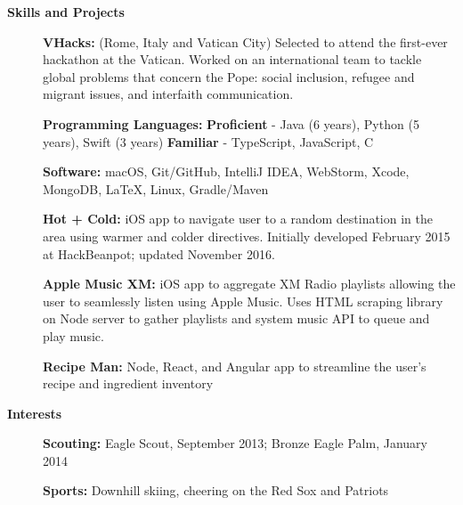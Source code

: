 \documentclass[letterpaper,10pt]{article}
\newcommand{\resheading}[1]{{\large \colorbox{mygrey}{\begin{minipage}{\textwidth}{\textbf{#1 \vphantom{p\^{E}}}}\end{minipage}}}}
\begin{document}
\resheading{Skills and Projects}
{\small
	\begin{description}
    \item[] \hspace{0.03in} \textbf{VHacks:} {\footnotesize (Rome, Italy and Vatican City) Selected to attend the first-ever hackathon at the Vatican. Worked on an international team to tackle global problems that concern the Pope: social inclusion, refugee and migrant issues, and interfaith communication.}
		\item[] \hspace{0.03in} \textbf{Programming Languages:} {\footnotesize \textbf{Proficient} - Java (6 years), Python (5 years), Swift (3 years) \enspace \textbf{Familiar} - TypeScript, JavaScript, C}
		\item[] \hspace{0.03in} \textbf{Software:} {\footnotesize macOS, Git/GitHub, IntelliJ IDEA, WebStorm, Xcode, MongoDB, \LaTeX, Linux, Gradle/Maven}
		\item[] \hspace{0.03in} \textbf{Hot + Cold:} {\footnotesize iOS app to navigate user to a random destination in the area using warmer and colder directives. Initially developed February 2015 at HackBeanpot; updated November 2016.}
		\item[] \hspace{0.03in} \textbf{Apple Music XM:} {\footnotesize iOS app to aggregate XM Radio playlists allowing the user to seamlessly listen using Apple Music. Uses HTML scraping library on Node server to gather playlists and system music API to queue and play music.}
    \item[] \hspace{0.03in} \textbf{Recipe Man:} {\footnotesize Node, React, and Angular app to streamline the user's recipe and ingredient inventory}
\end{description}}

\resheading{Interests}
{\small
	\begin{description}
		\item[] \hspace{0.03in} \textbf{Scouting:} {\footnotesize Eagle Scout, September 2013; Bronze Eagle Palm, January 2014}
		\item[] \hspace{0.03in} \textbf{Sports:} {\footnotesize Downhill skiing, cheering on the Red Sox and Patriots}
	\end{description}}
\end{document}
